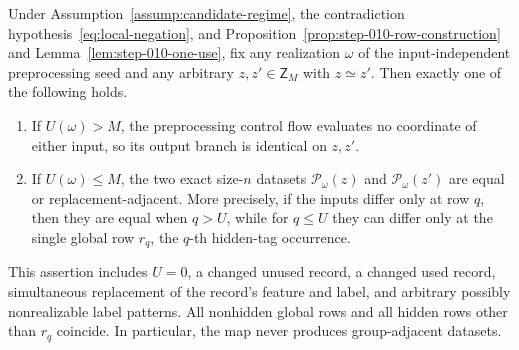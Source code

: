 \begin{lemma}\label{lem:step-012-one-row-map}
Under Assumption~\ref{assump:candidate-regime}, the contradiction hypothesis~\eqref{eq:local-negation},
and Proposition~\ref{prop:step-010-row-construction} and
Lemma~\ref{lem:step-010-one-use}, fix any realization \(\omega\) of
the input-independent preprocessing seed and any arbitrary
\(z,z'\in\mathsf Z_M\) with \(z\simeq z'\).  Then exactly one of the
following holds.

\begin{enumerate}
\item If \(U(\omega)>M\), the preprocessing control flow evaluates no
   coordinate of either input, so its output branch is identical on
   \(z,z'\).
\item If \(U(\omega)\le M\), the two exact size-\(n\) datasets
   \(\mathcal P_\omega(z)\) and \(\mathcal P_\omega(z')\) are equal or
   replacement-adjacent.  More precisely, if the inputs differ only at
   row \(q\), then they are equal when \(q>U\), while for \(q\le U\)
   they can differ only at the single global row \(r_q\), the \(q\)-th
   hidden-tag occurrence.
\end{enumerate}

This assertion includes \(U=0\), a changed unused record, a changed used
record, simultaneous replacement of the record's feature and label, and
arbitrary possibly nonrealizable label patterns.  All nonhidden global
rows and all hidden rows other than \(r_q\) coincide.  In particular, the
map never produces group-adjacent datasets.
\end{lemma}


